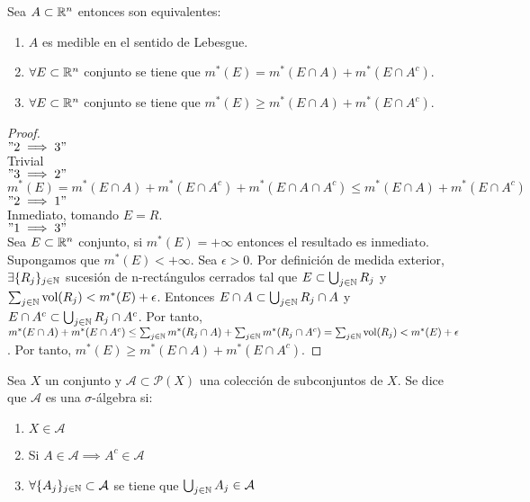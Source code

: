 \begin{proposición}
    Sea $A \subset \mathbb{R}^n$ entonces son equivalentes:
    \begin{enumerate}
        \item $A$ es medible en el sentido de Lebesgue.
        \item $\forall E \subset \mathbb{R}^n$ conjunto se tiene que $m^*(E) = m^*(E \cap A) + m^*(E \cap A^c)$.
        \item $\forall E \subset \mathbb{R}^n$ conjunto se tiene que $m^*(E) \geq m^*(E \cap A) + m^*(E \cap A^c)$.
    \end{enumerate}
\end{proposición}

\begin{proof}
    \leavevmode\\
    $"2 \implies 3"$\\
    Trivial\\
    $"3 \implies 2"$\\
    $m^*(E) = m^*(E \cap A) + m^*(E \cap A^c) + m^*(E \cap A \cap A^c) \leq m^*(E \cap A) + m^*(E \cap A^c)$\\
    $"2 \implies 1"$\\
    Inmediato, tomando $E = R$.\\
    $"1 \implies 3"$\\
    Sea $E \subset \mathbb{R}^n$ conjunto, si $m^*(E) = +\infty$ entonces el resultado es inmediato. Supongamos que $m^*(E) < +\infty$. Sea $\epsilon > 0$. Por definición de medida exterior, $\exists \{R_j\}_{j \in \mathbb{N}}$ sucesión de n-rectángulos cerrados tal que $E \subset \bigcup_{j \in \mathbb{N}} R_j$ y $\sum_{j \in \mathbb{N}} \text{vol}(R_j) < m^*(E) + \epsilon$. Entonces $E \cap A \subset \bigcup_{j \in \mathbb{N}} R_j \cap A$ y $E \cap A^c \subset \bigcup_{j \in \mathbb{N}} R_j \cap A^c$. Por tanto, $m^*(E \cap A) + m^*(E \cap A^c) \leq \sum_{j \in \mathbb{N}} m^*(R_j \cap A) + \sum_{j \in \mathbb{N}} m^*(R_j \cap A^c) = \sum_{j \in \mathbb{N}} \text{vol}(R_j) < m^*(E) + \epsilon$. Por tanto, $m^*(E) \geq m^*(E \cap A) + m^*(E \cap A^c)$.
\end{proof}

\begin{definición}
    Sea $X$ un conjunto y $\mathcal{A} \subset \mathcal{P}(X)$ una colección de subconjuntos de $X$. Se dice que $\mathcal{A}$ es una $\sigma$-álgebra si:
    \begin{enumerate}
        \item $X \in \mathcal{A}$
        \item Si $A \in \mathcal{A} \implies A^c \in \mathcal{A}$
        \item $\forall \{A_j\}_{j \in \mathbb{N}} \subset \mathcal{A}$ se tiene que $\bigcup_{j \in \mathbb{N}} A_j \in \mathcal{A}$
    \end{enumerate}
\end{definición}

